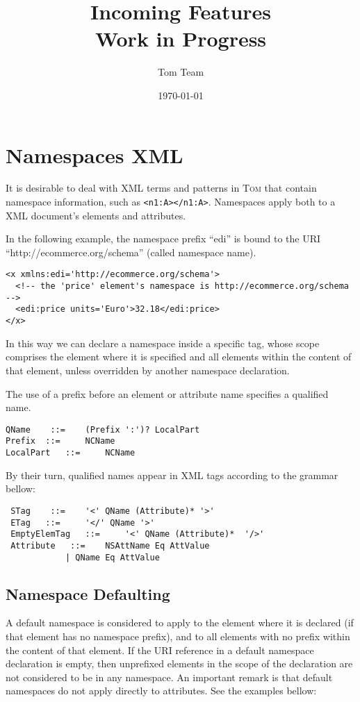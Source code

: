 \documentclass{article}
\title{Incoming Features\\Work in Progress}
\author{Tom Team}
\date\today
\newcommand{\tom}{\textsc{Tom} }
\begin{document}
\maketitle

\tableofcontents

\section{Namespaces XML}
It is desirable to deal with XML terms and patterns in \tom that contain namespace information, such as 
\verb$<n1:A></n1:A>$. Namespaces apply both to a XML document's elements and attributes. 

In the following example, the namespace prefix ``edi'' is bound to the URI ``http://ecommerce.org/schema'' (called namespace name). 

\begin{verbatim}
<x xmlns:edi='http://ecommerce.org/schema'>
  <!-- the 'price' element's namespace is http://ecommerce.org/schema -->
  <edi:price units='Euro'>32.18</edi:price>
</x>
\end{verbatim}

In this way we can declare a namespace inside a specific tag, whose scope comprises the element where it is specified and all elements within the content of that element, unless overridden by another namespace declaration. 

The use of a prefix before an element or attribute name specifies a qualified name.

\begin{verbatim}
QName 	 ::= 	(Prefix ':')? LocalPart
Prefix 	::= 	NCName
LocalPart 	::= 	NCName
\end{verbatim}


By their turn, qualified names appear in XML tags according to the grammar bellow:

\begin{verbatim}
 STag 	 ::= 	'<' QName (Attribute)* '>' 	 
 ETag 	::= 	'</' QName '>' 	
 EmptyElemTag 	::= 	'<' QName (Attribute)*  '/>' 	
 Attribute 	 ::= 	NSAttName Eq AttValue
			| QName Eq AttValue
\end{verbatim}

\subsection{Namespace Defaulting}


A default namespace is considered to apply to the element where it is declared (if that element has no namespace prefix), and to all elements with no prefix within the content of that element. If the URI reference in a default namespace declaration is empty, then unprefixed elements in the scope of the declaration are not considered to be in any namespace. An important remark is that default namespaces do not apply directly to attributes. See the examples bellow:
\end{document}
